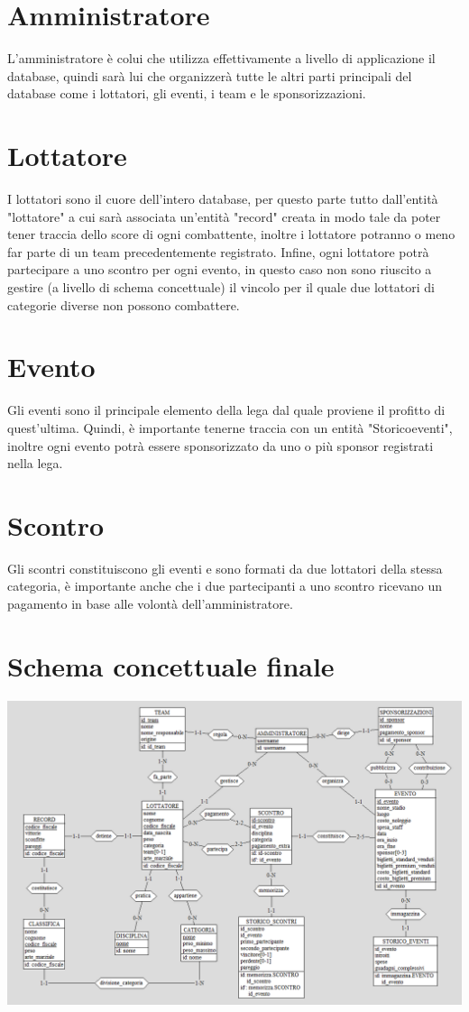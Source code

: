 \documentclass[a4paper,12pt]{report}
\begin{document}
\section{Amministratore}
L'amministratore è colui che utilizza effettivamente a livello di applicazione il database, quindi sarà lui che organizzerà tutte  
le altri parti principali del database come i lottatori, gli eventi, i team e le sponsorizzazioni.

\section{Lottatore}
I lottatori sono il cuore dell'intero database, per questo parte tutto dall'entità "lottatore" a cui sarà associata un'entità 
"record" creata in modo tale da poter tener traccia dello score di ogni combattente, inoltre i lottatore potranno o meno far parte 
di un team precedentemente registrato. Infine, ogni lottatore potrà partecipare a uno scontro per ogni evento, 
in questo caso non sono riuscito a gestire (a livello di schema concettuale) il vincolo per il quale due lottatori 
di categorie diverse non possono combattere.

\section{Evento}
Gli eventi sono il principale elemento della lega dal quale proviene il profitto di quest'ultima. Quindi, è importante 
tenerne traccia con un entità "Storico\textunderscore eventi", inoltre ogni evento potrà essere sponsorizzato da uno o più sponsor registrati nella lega.

\section{Scontro}
Gli scontri constituiscono gli eventi e sono formati da due lottatori della stessa categoria, è importante anche che i due partecipanti 
a uno scontro ricevano un pagamento in base alle volontà dell'amministratore.

\section{Schema concettuale finale}
\includegraphics[scale=0.8, angle=90]{./img/schema_finale.png}
\end{document}
